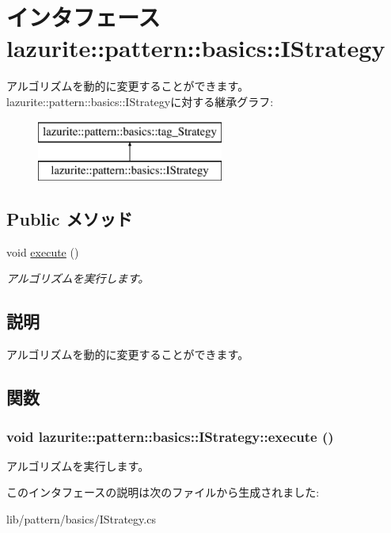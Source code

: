 \hypertarget{interfacelazurite_1_1pattern_1_1basics_1_1_i_strategy}{
\section{インタフェース lazurite::pattern::basics::IStrategy}
\label{interfacelazurite_1_1pattern_1_1basics_1_1_i_strategy}
}


アルゴリズムを動的に変更することができます。  
lazurite::pattern::basics::IStrategyに対する継承グラフ:\begin{figure}[H]
\begin{center}
\leavevmode
\includegraphics[height=2cm]{interfacelazurite_1_1pattern_1_1basics_1_1_i_strategy}
\end{center}
\end{figure}
\subsection*{Public メソッド}
\begin{DoxyCompactItemize}
\item 
void \hyperlink{interfacelazurite_1_1pattern_1_1basics_1_1_i_strategy_ab2aba386be602c152715a69936d8422f}{execute} ()
\begin{DoxyCompactList}\small\item\em アルゴリズムを実行します。 \item\end{DoxyCompactList}\end{DoxyCompactItemize}


\subsection{説明}
アルゴリズムを動的に変更することができます。 

\subsection{関数}
\hypertarget{interfacelazurite_1_1pattern_1_1basics_1_1_i_strategy_ab2aba386be602c152715a69936d8422f}{
\subsubsection[{execute}]{\setlength{\rightskip}{0pt plus 5cm}void lazurite::pattern::basics::IStrategy::execute ()}}
\label{interfacelazurite_1_1pattern_1_1basics_1_1_i_strategy_ab2aba386be602c152715a69936d8422f}


アルゴリズムを実行します。 

このインタフェースの説明は次のファイルから生成されました:\begin{DoxyCompactItemize}
\item 
lib/pattern/basics/IStrategy.cs\end{DoxyCompactItemize}
